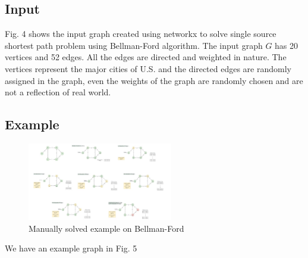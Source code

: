\documentclass[lettersize,journal]{IEEEtran}
\begin{document}
\subsection{Input}
Fig. 4 shows the input graph created using networkx to solve single source shortest path problem using Bellman-Ford algorithm. The input graph \(G\) has 20 vertices and 52 edges. All the edges are directed and weighted in nature. The vertices represent the major cities of U.S. and the directed edges are randomly assigned in the graph, even the weights of the graph are randomly chosen and are not a reflection of real world. 

\subsection{Example}

\begin{figure}[!t]
\centering
\includegraphics[width=2.5in]{EX_bellman-ford.jpeg}
\caption{Manually solved example on Bellman-Ford \cite{bellmanford_gfg}}
\label{fig_4}
\end{figure}

We have an example graph in Fig. 5
\end{document}
